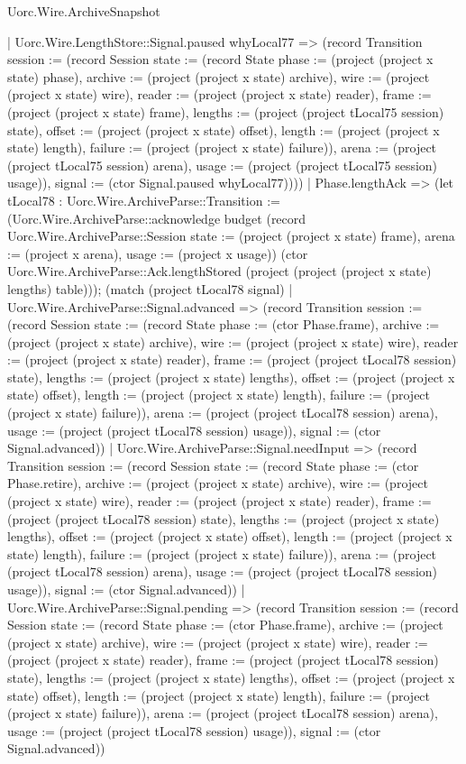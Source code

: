 \begin{lexlean}{Uorc.Wire.ArchiveSnapshot}
\begin{semanticmodule}
{        | Uorc.Wire.LengthStore::Signal.paused whyLocal77 => (record Transition {session := (record Session {state := (record State {phase := (project (project x state) phase), archive := (project (project x state) archive), wire := (project (project x state) wire), reader := (project (project x state) reader), frame := (project (project x state) frame), lengths := (project (project tLocal75 session) state), offset := (project (project x state) offset), length := (project (project x state) length), failure := (project (project x state) failure)}), arena := (project (project tLocal75 session) arena), usage := (project (project tLocal75 session) usage)}), signal := (ctor Signal.paused whyLocal77)})))
      | Phase.lengthAck => (let tLocal78 : Uorc.Wire.ArchiveParse::Transition := (Uorc.Wire.ArchiveParse::acknowledge budget (record Uorc.Wire.ArchiveParse::Session {state := (project (project x state) frame), arena := (project x arena), usage := (project x usage)}) (ctor Uorc.Wire.ArchiveParse::Ack.lengthStored (project (project (project x state) lengths) table))); (match (project tLocal78 signal)
        | Uorc.Wire.ArchiveParse::Signal.advanced => (record Transition {session := (record Session {state := (record State {phase := (ctor Phase.frame), archive := (project (project x state) archive), wire := (project (project x state) wire), reader := (project (project x state) reader), frame := (project (project tLocal78 session) state), lengths := (project (project x state) lengths), offset := (project (project x state) offset), length := (project (project x state) length), failure := (project (project x state) failure)}), arena := (project (project tLocal78 session) arena), usage := (project (project tLocal78 session) usage)}), signal := (ctor Signal.advanced)})
        | Uorc.Wire.ArchiveParse::Signal.needInput => (record Transition {session := (record Session {state := (record State {phase := (ctor Phase.retire), archive := (project (project x state) archive), wire := (project (project x state) wire), reader := (project (project x state) reader), frame := (project (project tLocal78 session) state), lengths := (project (project x state) lengths), offset := (project (project x state) offset), length := (project (project x state) length), failure := (project (project x state) failure)}), arena := (project (project tLocal78 session) arena), usage := (project (project tLocal78 session) usage)}), signal := (ctor Signal.advanced)})
        | Uorc.Wire.ArchiveParse::Signal.pending => (record Transition {session := (record Session {state := (record State {phase := (ctor Phase.frame), archive := (project (project x state) archive), wire := (project (project x state) wire), reader := (project (project x state) reader), frame := (project (project tLocal78 session) state), lengths := (project (project x state) lengths), offset := (project (project x state) offset), length := (project (project x state) length), failure := (project (project x state) failure)}), arena := (project (project tLocal78 session) arena), usage := (project (project tLocal78 session) usage)}), signal := (ctor Signal.advanced)})
}
\end{semanticmodule}
\end{lexlean}
